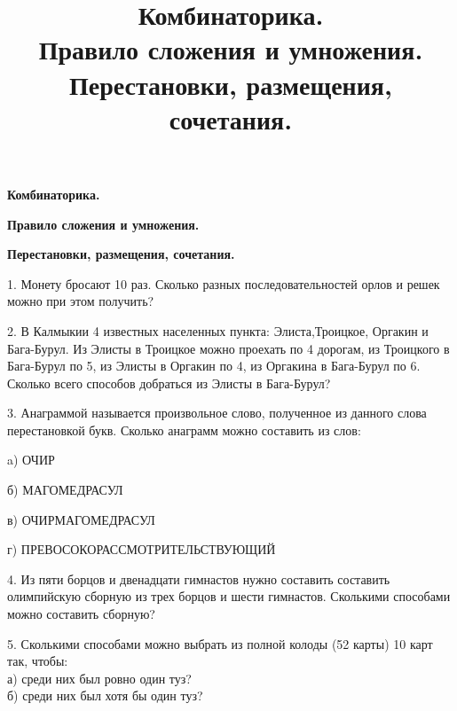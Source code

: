 \centerline{\bf \Huge Комбинаторика.} 
\centerline{\bf \Huge Правило сложения и умножения.}
\centerline{\bf \Huge Перестановки, размещения, сочетания.}
\title{Комбинаторика. \\ Правило сложения и умножения. \\ Перестановки, размещения, сочетания.}

1. Монету бросают 10 раз. Сколько разных последовательностей орлов и решек можно при этом получить?

2. В Калмыкии 4 известных населенных пункта: Элиста,Троицкое, Оргакин и Бага-Бурул. Из Элисты в Троицкое можно проехать по 4 дорогам, из Троицкого в Бага-Бурул по 5, из Элисты в Оргакин по 4, из Оргакина в Бага-Бурул по 6. Сколько всего способов добраться из Элисты в Бага-Бурул? 

3. Анаграммой называется произвольное слово, полученное из данного слова перестановкой букв. Сколько анаграмм можно составить из слов:

\par 

a) ОЧИР

б) МАГОМЕДРАСУЛ

в) ОЧИРМАГОМЕДРАСУЛ

г) ПРЕВОСОКОРАССМОТРИТЕЛЬСТВУЮЩИЙ

4. Из пяти борцов и двенадцати гимнастов нужно составить составить олимпийскую сборную из трех борцов и шести гимнастов. Сколькими способами можно составить сборную?

5. Сколькими способами можно выбрать из полной колоды (52 карты) 10 карт так, чтобы: \\
а) среди них был ровно один туз? \\ 
б) среди них был хотя бы один туз?
